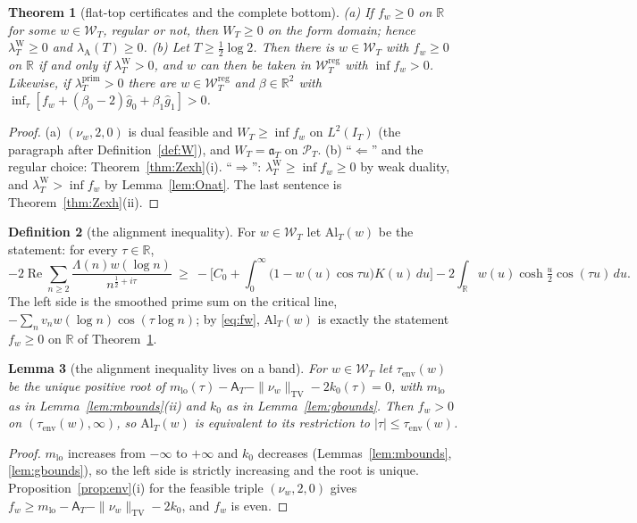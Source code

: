 \documentclass[11pt]{amsart}
\newtheorem{theorem}{Theorem}[section]
\newtheorem{lemma}[theorem]{Lemma}
\theoremstyle{definition}
\newtheorem{definition}[theorem]{Definition}
\theoremstyle{remark}
\newcommand{\R}{\mathbb R}
\newcommand{\Rel}{\operatorname{Re}}
\newcommand{\TV}{\operatorname{TV}}
\newcommand{\PT}{\mathcal P_T}
\newcommand{\IT}{I_T}
\newcommand{\lamP}{\lambda^{\mathrm{prim}}_T}
\newcommand{\lamW}{\lambda^{\mathrm W}_T}
\newcommand{\lamA}{\lambda_{\mathrm A}(T)}
\newcommand{\gh}[1]{\widehat g_{#1}}
\newcommand{\Wcl}{\mathcal W_T}
\newcommand{\Aconst}{\mathsf A_T}
\begin{document}
\begin{theorem}[flat-top certificates and the complete bottom]\label{thm:Al}
\emph{(a)} If $f_w\ge0$ on $\R$ for some $w\in\Wcl$, regular or not, then $W_T\ge0$ on the form domain;
hence $\lamW\ge0$ and $\lamA\ge0$.
\emph{(b)} Let $T\ge\frac12\log2$. Then there is $w\in\Wcl$ with $f_w\ge0$ on $\R$ if and only if
$\lamW>0$, and $w$ can then be taken in $\Wcl^{\mathrm{reg}}$ with $\inf f_w>0$. Likewise, if $\lamP>0$
there are $w\in\Wcl^{\mathrm{reg}}$ and $\beta\in\R^2$ with $\inf_\tau[f_w+(\beta_0-2)\gh0+\beta_1\gh1]>0$.
\end{theorem}
\begin{proof}
(a) $(\nu_w,2,0)$ is dual feasible and $W_T\ge\inf f_w$ on $L^2(\IT)$ (the paragraph after
Definition~\ref{def:W}), and $W_T=\mathfrak a_T$ on $\PT$. (b) ``$\Leftarrow$'' and the regular choice:
Theorem~\ref{thm:Zexh}(i). ``$\Rightarrow$'': $\lamW\ge\inf f_w\ge0$ by weak duality, and $\lamW>\inf f_w$ by
Lemma~\ref{lem:Onat}. The last sentence is Theorem~\ref{thm:Zexh}(ii).
\end{proof}

\begin{definition}[the alignment inequality]\label{def:Al}
For $w\in\Wcl$ let $\mathrm{Al}_T(w)$ be the statement: for every $\tau\in\R$,
\[
-2\Rel\sum_{n\ge2}\frac{\Lambda(n)w(\log n)}{n^{\frac12+i\tau}}\ \ge\
-\Big[C_0+\int_0^\infty\big(1-w(u)\cos\tau u\big)K(u)\,du\Big]-2\int_\R w(u)\cosh\tfrac u2\cos(\tau u)\,du .
\]
The left side is the smoothed prime sum on the critical line, $-\sum_nv_nw(\log n)\cos(\tau\log n)$; by
\eqref{eq:fw}, $\mathrm{Al}_T(w)$ is exactly the statement $f_w\ge0$ on $\R$ of Theorem~\ref{thm:Al}.
\end{definition}

\begin{lemma}[the alignment inequality lives on a band]\label{lem:Alband}
For $w\in\Wcl$ let $\tau_{\mathrm{env}}(w)$ be the unique positive root of
$m_{\mathrm{lo}}(\tau)-\Aconst-\|\nu_w\|_{\TV}-2k_0(\tau)=0$, with $m_{\mathrm{lo}}$ as in Lemma~\ref{lem:mbounds}(ii)
and $k_0$ as in Lemma~\ref{lem:gbounds}. Then $f_w>0$ on $(\tau_{\mathrm{env}}(w),\infty)$, so $\mathrm{Al}_T(w)$ is
equivalent to its restriction to $|\tau|\le\tau_{\mathrm{env}}(w)$.
\end{lemma}
\begin{proof}
$m_{\mathrm{lo}}$ increases from $-\infty$ to $+\infty$ and $k_0$ decreases (Lemmas~\ref{lem:mbounds}, \ref{lem:gbounds}),
so the left side is strictly increasing and the root is unique. Proposition~\ref{prop:env}(i) for the feasible
triple $(\nu_w,2,0)$ gives $f_w\ge m_{\mathrm{lo}}-\Aconst-\|\nu_w\|_{\TV}-2k_0$, and $f_w$ is even.
\end{proof}
\end{document}
